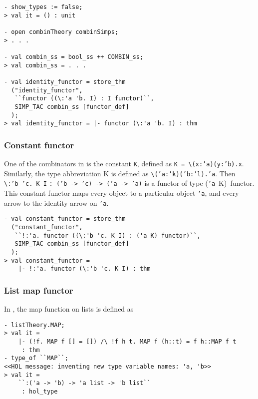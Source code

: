 \begin{session}
\begin{verbatim}
- show_types := false;
> val it = () : unit

- open combinTheory combinSimps;
> . . .

- val combin_ss = bool_ss ++ COMBIN_ss;
> val combin_ss = . . .

- val identity_functor = store_thm
  ("identity_functor",
   ``functor ((\:'a 'b. I) : I functor)``,
   SIMP_TAC combin_ss [functor_def]
  );
> val identity_functor = |- functor (\:'a 'b. I) : thm
\end{verbatim}
\end{session}

\subsubsection{Constant functor}

One of the combinators in \HOL{} is the constant {\tt K},
defined as {\tt K~=~}\verb|\|{\tt (x:'a)(y:'b).x}. Similarly,
the type abbreviation {\sf K} is
defined as \verb|\|{\tt ('a:'k)('b:'l).'a}.
Then 
\verb|\|{\tt {:}'b~'c.~K~I}
{\tt : ('b -> 'c) -> ('a -> 'a)}
is a functor of type {\sf ({\tt 'a}~K)~functor}.
This constant functor maps every object to a particular object {\tt 'a},
and every arrow to the identity arrow on {\tt 'a}.

\begin{session}
\begin{verbatim}
- val constant_functor = store_thm
  ("constant_functor",
   ``!:'a. functor ((\:'b 'c. K I) : ('a K) functor)``,
   SIMP_TAC combin_ss [functor_def]
  );
> val constant_functor =
    |- !:'a. functor (\:'b 'c. K I) : thm
\end{verbatim}
\end{session}

\subsubsection{List map functor}

In \HOL{}, the map function on lists is defined as
\begin{session}
\begin{verbatim}
- listTheory.MAP;
> val it =
    |- (!f. MAP f [] = []) /\ !f h t. MAP f (h::t) = f h::MAP f t
     : thm
- type_of ``MAP``;
<<HOL message: inventing new type variable names: 'a, 'b>>
> val it =
    ``:('a -> 'b) -> 'a list -> 'b list``
     : hol_type
\end{verbatim}
\end{session}

